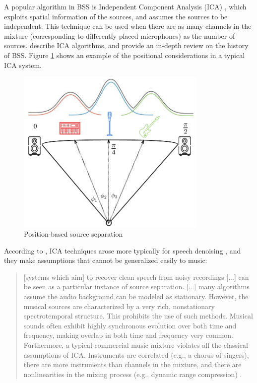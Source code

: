 \documentclass[report.tex]{subfiles}
\begin{document}
A popular algorithm in BSS is Independent Component Analysis (ICA) \parencite{musicmask, musicsepgood, musicsepintro1}, which exploits spatial information of the sources, and assumes the sources to be independent. This technique can be used when there are as many channels in the mixture (corresponding to differently placed microphones) as the number of sources. \textcite{ica1, ica2} describe ICA algorithms, and \textcite{blind1, blind2} provide an in-depth review on the history of BSS. Figure \ref{fig:icaposition} shows an example of the positional considerations in a typical ICA system.

\begin{figure}[ht]
	\centering
	\includegraphics[height=8cm]{./images-mss/positional.png}
	\caption{Position-based source separation \parencite[35]{musicsepgood}}
\label{fig:icaposition}
\end{figure}

According to \citeauthor{musicsepintro1}, ICA techniques arose more typically for speech denoising \parencite{speechsep}, and they make assumptions that cannot be generalized easily to music:

\begin{quote}
	[systems which aim] to recover clean speech from noisy recordings [...] can be seen as a particular instance of source separation. [...] many algorithms assume the audio background can be modeled as stationary. However, the musical sources are characterized by a very rich, nonstationary spectrotemporal structure. This prohibits the use of such methods. Musical sounds often exhibit highly synchronous evolution over both time and frequency, making overlap in both time and frequency very common. Furthermore, a typical commercial music mixture violates all the classical assumptions of ICA. Instruments are correlated (e.g., a chorus of singers), there are more instruments than channels in the mixture, and there are nonlinearities in the mixing process (e.g., dynamic range compression) \parencite[1]{musicsepintro1}.
\end{quote}
\end{document}
